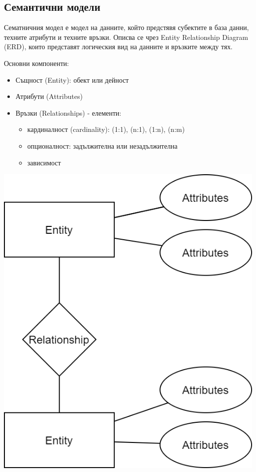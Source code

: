 \documentclass[fleqn,12pt]{article}
\begin{document}
\subsection{Семантични модели}
Сематничния модел е модел на данните, който предстявя субектите в база данни, техните атрибути и техните връзки. Описва се чрез Entity Relationship Diagram (ERD), които представят логическия вид на данните и връзките между тях.
\begin{multicols}{2}

Основни компоненти:
\begin{itemize}
	\item Същност (Entity): обект или дейност
	\item Атрибути (Attributes)
	\item Връзки (Relationships) - елементи:
	\begin{itemize}
		\item кардиналност (cardinality): (1:1), (n:1), (1:n), (n:m)
		\item опционалност: задължителна или незадължителна
		\item зависимост
	\end{itemize}
\end{itemize}

\includegraphics[scale=.33]{ERD}

\end{multicols}
\end{document}
